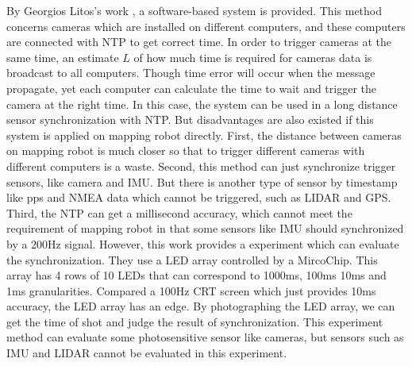 \documentclass[conference]{IEEEtran}
\begin{document}
	By Georgios Litos's work \cite{Litos2006Synchronous}, a software-based system is provided. This method concerns cameras which are installed on different computers, and these computers are connected with NTP to get correct time. In order to trigger cameras at the same time, an estimate $L$ of how much time is required for cameras data is broadcast to all computers. Though time error will occur when the message propagate, yet each computer can calculate the time to wait and trigger the camera at the right time. In this case, the system can be used in a long distance sensor synchronization with NTP. But disadvantages are also existed if this system is applied on mapping robot directly. First, the distance between cameras on mapping robot is much closer so that to trigger different cameras with different computers is a waste. Second, this method can just synchronize trigger sensors, like camera and IMU. But there is another type of sensor by timestamp like pps and NMEA data which cannot be triggered, such as LIDAR and GPS. Third, the NTP can get a millisecond accuracy, which cannot meet the requirement of mapping robot in that some sensors like IMU should synchronized by a 200Hz signal. However, this work \cite{Litos2006Synchronous} provides a experiment which can evaluate the synchronization. They use a LED array controlled by a MircoChip. This array has 4 rows of 10 LEDs that can correspond to 1000ms, 100ms 10ms and 1ms granularities. Compared a 100Hz CRT screen which just provides 10ms accuracy, the LED array has an edge. By photographing the LED array, we can get the time of shot and judge the result of synchronization. This experiment method can evaluate some photosensitive sensor like cameras, but sensors such as IMU and LIDAR cannot be evaluated in this experiment.
	\par
\end{document}
